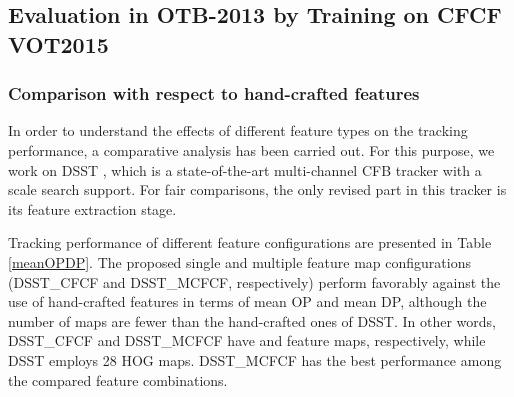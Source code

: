 \documentclass[journal]{IEEEtran}
\begin{document}
\subsection{Evaluation in OTB-2013 by Training on CFCF VOT2015}
\subsubsection{Comparison with respect to hand-crafted features}
In order to understand the effects of different feature types on the tracking performance, a comparative analysis has been carried out. For this purpose, we work on DSST \cite{DSST}, which is a state-of-the-art multi-channel CFB tracker with a scale search support. For fair comparisons, the only revised part in this tracker is its feature extraction stage.
\begin{table*}
\caption{\label{meanOPDP}\small Analysis on feature type and quantity. \textbf{Raw}: raw image intensities, \textbf{X Grad}: magnitude of the horizontal gradient, \textbf{Y Grad}: magnitude of the vertical gradient, \textbf{CFCF}: learned single feature, \textbf{MCFCF}: learned multiple features. \textbf{Mean OP}: average overlap score with the threshold 0.5, \textbf{Mean DP}: average center location error with the threshold  pixels.}
\normalsize
{}
\end{table*}
Tracking performance of different feature configurations are presented in Table \ref{meanOPDP}. The proposed single and multiple feature map configurations (DSST\_CFCF and DSST\_MCFCF, respectively) perform favorably against the use of hand-crafted features in terms of mean OP and mean DP, although the number of maps are fewer than the hand-crafted ones of DSST. In other words, DSST\_CFCF and DSST\_MCFCF have  and  feature maps, respectively, while DSST employs 28 HOG maps. DSST\_MCFCF has the best performance among the compared feature combinations.
\end{document}
